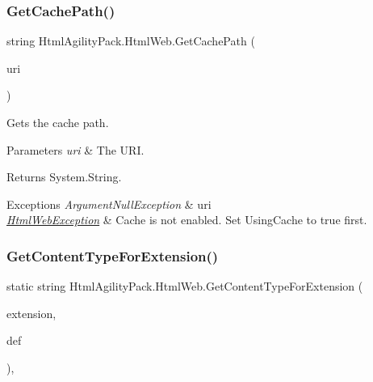 \subsubsection{\texorpdfstring{Get\+Cache\+Path()}{GetCachePath()}}
{\footnotesize\ttfamily string Html\+Agility\+Pack.\+Html\+Web.\+Get\+Cache\+Path (\begin{DoxyParamCaption}\item[{Uri}]{uri }\end{DoxyParamCaption})\hspace{0.3cm}{\ttfamily [inline]}}



Gets the cache path. 


\begin{DoxyParams}{Parameters}
{\em uri} & The U\+RI.\\
\hline
\end{DoxyParams}
\begin{DoxyReturn}{Returns}
System.\+String.
\end{DoxyReturn}

\begin{DoxyExceptions}{Exceptions}
{\em Argument\+Null\+Exception} & uri\\
\hline
{\em \hyperlink{class_html_agility_pack_1_1_html_web_exception}{Html\+Web\+Exception}} & Cache is not enabled. Set Using\+Cache to true first.\\
\hline
\end{DoxyExceptions}
\mbox{\label{class_html_agility_pack_1_1_html_web_a54df7f220aa98ea6306f8a9b8cae8926}} 
\subsubsection{\texorpdfstring{Get\+Content\+Type\+For\+Extension()}{GetContentTypeForExtension()}}
{\footnotesize\ttfamily static string Html\+Agility\+Pack.\+Html\+Web.\+Get\+Content\+Type\+For\+Extension (\begin{DoxyParamCaption}\item[{string}]{extension,  }\item[{string}]{def }\end{DoxyParamCaption})\hspace{0.3cm}{\ttfamily [inline]}, {\ttfamily [static]}}



